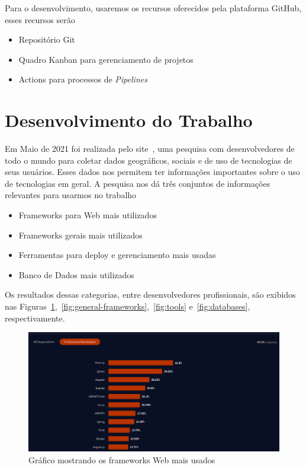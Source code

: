 \documentclass[12pt]{article}
\begin{document}
Para o desenvolvimento, usaremos os recursos oferecidos pela plataforma GitHub, esses recursos serão

\begin{itemize}
  \item Repositório Git
  \item Quadro Kanban para gerenciamento de projetos
  \item Actions para processos de \textit{Pipelines}
\end{itemize}

\section{Desenvolvimento do Trabalho}

Em Maio de 2021 foi realizada pelo site~\cite{stack11}, uma pesquisa com desenvolvedores de todo o mundo para
coletar dados geográficos, sociais e de uso de tecnologias de seus usuários. Esses dados nos permitem ter
informações importantes sobre o uso de tecnologias em geral. A pesquisa nos dá três conjuntos
de informações relevantes para usarmos no trabalho

\begin{itemize}
  \item Frameworks para Web mais utilizados
  \item Frameworks gerais mais utilizados
  \item Ferramentas para deploy e gerenciamento mais usadas
  \item Banco de Dados mais utilizados
\end{itemize}

Os resultados dessas categorias, entre desenvolvedores profissionais, são exibidos nas
Figuras~\ref{fig:web-frameworks},~\ref{fig:general-frameworks},~\ref{fig:tools} e~\ref{fig:databases}, respectivamente.

\begin{figure}[H]
  \centering
  \includegraphics[width=1\textwidth]{stackoverflow/web_frameworks_usage.png}
  \caption{Gráfico mostrando os frameworks Web mais usados}\label{fig:web-frameworks}
\end{figure}
\end{document}
